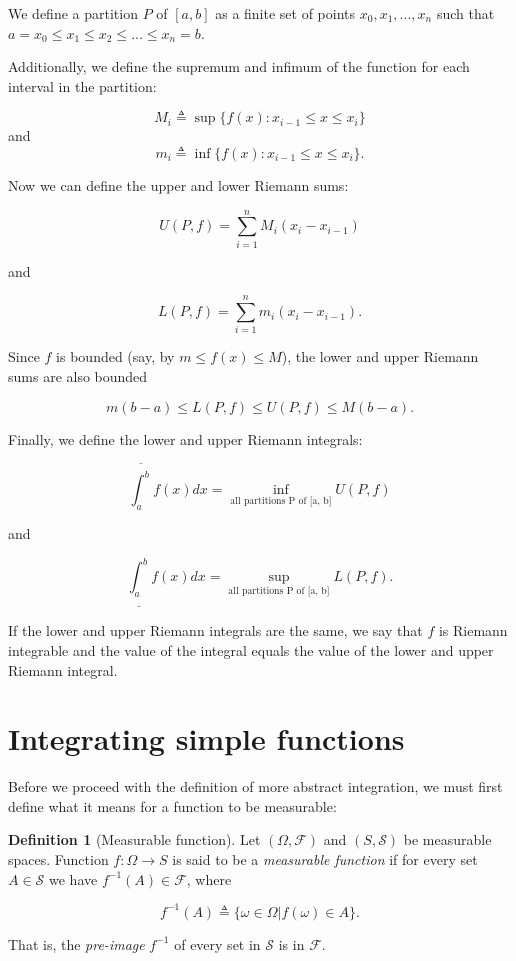 \documentclass{book}
\theoremstyle{plain}%
\theoremstyle{definition}
\newtheorem{definition}{Definition}[section]
\newlength{\arrow}
\begin{document}
We define a partition $P$ of $[a,b]$ as a finite set of points $x_0, x_1,...,x_n$ such that $a = x_0 \leq x_1 \leq x_2 \leq ... \leq x_n = b$.

Additionally, we define the supremum and infimum of the function for each interval in the partition:

$$M_i \triangleq \sup\{f(x): x_{i-1} \leq x \leq x_i \}$$ and $$m_i \triangleq \inf\{f(x): x_{i-1} \leq x \leq x_i \}.$$

Now we can define the upper and lower Riemann sums:

$$U(P, f) = \sum_{i=1}^n M_i (x_i - x_{i-1})$$

and

$$L(P, f) = \sum_{i=1}^n m_i (x_i - x_{i-1}).$$

Since $f$ is bounded (say, by $m \leq f(x) \leq M$), the lower and upper Riemann sums are also bounded

$$m(b-a) \leq L(P, f) \leq U(P, f) \leq M(b-a).$$

Finally, we define the lower and upper Riemann integrals:

$$\overline{\int_a^b} f(x)dx =  \inf_\text{all partitions P of [a, b]} U(P,f)$$

and

$$\underline{\int_a^b} f(x)dx =  \sup_\text{all partitions P of [a, b]} L(P,f).$$


If the lower and upper Riemann integrals are the same, we say that $f$ is Riemann integrable and the value of the integral equals the value of the lower and upper Riemann integral.

\section{Integrating simple functions}

Before we proceed with the definition of more abstract integration, we must first define what it means for a function to be measurable:

\begin{definition}[Measurable function]
Let $(\Omega, \mathcal{F})$ and $(S, \mathcal{S})$ be measurable spaces. Function $f: \Omega \rightarrow S$ is said to be a \emph{measurable function} if for every set $A \in \mathcal{S}$ we have $f^{-1}(A) \in \mathcal{F}$, where

$$f^{-1}(A) \triangleq \{\omega \in \Omega | f(\omega) \in A\}.$$

That is, the \emph{pre-image} $f^{-1}$ of every set in $\mathcal{S}$ is in $\mathcal{F}$.\label{def:measurable}
\end{definition}
\end{document}
